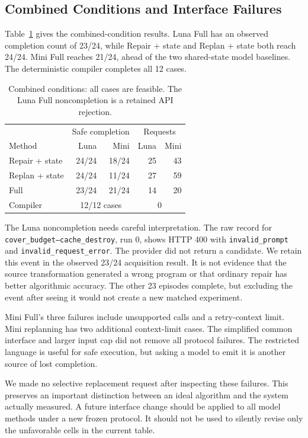\documentclass[conference]{IEEEtran}
\newcommand{\code}[1]{\texttt{#1}}
\newcommand{\smalltable}{\fontsize{8}{9.5}\selectfont}
\begin{document}
\subsection{Combined Conditions and Interface Failures}
Table~\ref{tab:combined} gives the combined-condition results. Luna Full has an observed completion count of 23/24, while Repair + state and Replan + state both reach 24/24. Mini Full reaches 21/24, ahead of the two shared-state model baselines. The deterministic compiler completes all 12 cases.

\begin{table}[t]
\caption{Combined conditions: all cases are feasible. The Luna Full noncompletion is a retained API rejection.}
\label{tab:combined}
\centering\smalltable
\begin{tabular}{lrrrr}
\toprule
&\multicolumn{2}{c}{Safe completion}&\multicolumn{2}{c}{Requests}\\
Method&Luna&Mini&Luna&Mini\\
\midrule
Repair + state&24/24&18/24&25&43\\
Replan + state&24/24&11/24&27&59\\
Full&23/24&21/24&14&20\\
Compiler&\multicolumn{2}{c}{12/12 cases}&\multicolumn{2}{c}{0}\\
\bottomrule
\end{tabular}
\end{table}

The Luna noncompletion needs careful interpretation. The raw record for \code{cover\_budget--cache\_destroy}, run 0, shows HTTP 400 with \code{invalid\_prompt} and \code{invalid\_request\_error}. The provider did not return a candidate. We retain this event in the observed 23/24 acquisition result. It is not evidence that the source transformation generated a wrong program or that ordinary repair has better algorithmic accuracy. The other 23 episodes complete, but excluding the event after seeing it would not create a new matched experiment.

Mini Full's three failures include unsupported calls and a retry-context limit. Mini replanning has two additional context-limit cases. The simplified common interface and larger input cap did not remove all protocol failures. The restricted language is useful for safe execution, but asking a model to emit it is another source of lost completion.

We made no selective replacement request after inspecting these failures. This preserves an important distinction between an ideal algorithm and the system actually measured. A future interface change should be applied to all model methods under a new frozen protocol. It should not be used to silently revise only the unfavorable cells in the current table.
\end{document}
